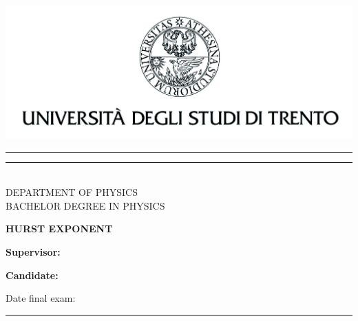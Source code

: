 \begin{titlepage}
	\begin{center}
		\includegraphics{10000000000004E1000001E114DE41E38E5F0A34.jpg}
		\\
		\vspace{2em}
		\rule[0.1cm]{15cm}{0.1mm}
		\rule[0.5cm]{15cm}{0.6mm}
		\\
		\vspace{2em}
		{{ DEPARTMENT OF PHYSICS }} 
		\\
		\vspace{2em}
		{{ BACHELOR DEGREE IN PHYSICS }}
		\\
	\end{center}
	\vspace{15mm}
	\begin{center}
		{\huge{\bf HURST EXPONENT}}
	\end{center}
	\vspace{35mm}
	\par
	\noindent
	\begin{minipage}[t]{0.47\textwidth}
		{\Large{\bf Supervisor:\\
				}}
	\end{minipage}
	\hfill
	\begin{minipage}[t]{0.47\textwidth}\raggedleft
		{\Large{\bf Candidate:\\
				}}
	\end{minipage}
	
	\vfill
	{\large{ Date final exam: \\}}
	\rule[0.1cm]{15cm}{0.1mm}
\end{titlepage}